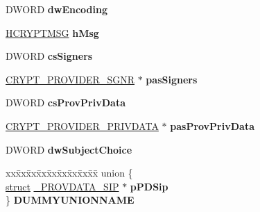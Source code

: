 \begin{DoxyCompactItemize}
D\+W\+O\+RD {\bfseries dw\+Encoding}
\item 
\mbox{\label{struct___c_r_y_p_t___p_r_o_v_i_d_e_r___d_a_t_a_acb32afcb6df2ac4ed824eb001a59ab9f}} 
\hyperlink{interfacevoid}{H\+C\+R\+Y\+P\+T\+M\+SG} {\bfseries h\+Msg}
\item 
\mbox{\label{struct___c_r_y_p_t___p_r_o_v_i_d_e_r___d_a_t_a_a6b4aa7c411301ea40b12df85ebf6af4e}} 
D\+W\+O\+RD {\bfseries cs\+Signers}
\item 
\mbox{\label{struct___c_r_y_p_t___p_r_o_v_i_d_e_r___d_a_t_a_a5c1fe15eb8298c1629bfeb555a33df75}} 
\hyperlink{struct___c_r_y_p_t___p_r_o_v_i_d_e_r___s_g_n_r}{C\+R\+Y\+P\+T\+\_\+\+P\+R\+O\+V\+I\+D\+E\+R\+\_\+\+S\+G\+NR} $\ast$ {\bfseries pas\+Signers}
\item 
\mbox{\label{struct___c_r_y_p_t___p_r_o_v_i_d_e_r___d_a_t_a_a5ea444bac19e673772ac5f7635dec624}} 
D\+W\+O\+RD {\bfseries cs\+Prov\+Priv\+Data}
\item 
\mbox{\label{struct___c_r_y_p_t___p_r_o_v_i_d_e_r___d_a_t_a_a2146914a3a46ba4551963257f34fa424}} 
\hyperlink{struct___c_r_y_p_t___p_r_o_v_i_d_e_r___p_r_i_v_d_a_t_a}{C\+R\+Y\+P\+T\+\_\+\+P\+R\+O\+V\+I\+D\+E\+R\+\_\+\+P\+R\+I\+V\+D\+A\+TA} $\ast$ {\bfseries pas\+Prov\+Priv\+Data}
\item 
\mbox{\label{struct___c_r_y_p_t___p_r_o_v_i_d_e_r___d_a_t_a_a7be9224e54605a7d251d42feff16f36a}} 
D\+W\+O\+RD {\bfseries dw\+Subject\+Choice}
\item 
\mbox{\label{struct___c_r_y_p_t___p_r_o_v_i_d_e_r___d_a_t_a_a13abcde4a418fbdad2af61623d84dc02}} 
\begin{tabbing}
xx\=xx\=xx\=xx\=xx\=xx\=xx\=xx\=xx\=\kill
union \{\\
\>\hyperlink{interfacestruct}{struct} \hyperlink{struct___p_r_o_v_d_a_t_a___s_i_p}{\_PROVDATA\_SIP} $\ast$ {\bfseries pPDSip}\\
\} {\bfseries DUMMYUNIONNAME}\\


\end{tabbing}
\end{DoxyCompactItemize}
